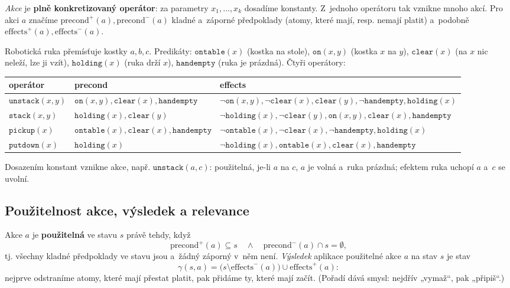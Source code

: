 \begin{definice}[Akce]
\emph{Akce} je \textbf{plně konkretizovaný operátor}: za parametry $x_1,\dots,x_k$ dosadíme konstanty. Z~jednoho operátoru tak vznikne mnoho akcí. Pro akci $a$ značíme $\mathrm{precond}^{+}(a),\mathrm{precond}^{-}(a)$ kladné a~záporné předpoklady (atomy, které mají, resp. nemají platit) a~podobně $\mathrm{effects}^{+}(a),\mathrm{effects}^{-}(a)$.
\end{definice}

\begin{priklad}
Robotická ruka přemísťuje kostky $a,b,c$. Predikáty: $\mathtt{ontable}(x)$ (kostka na stole), $\mathtt{on}(x,y)$ (kostka $x$ na $y$), $\mathtt{clear}(x)$ (na $x$ nic neleží, lze ji vzít), $\mathtt{holding}(x)$ (ruka drží $x$), $\mathtt{handempty}$ (ruka je prázdná). Čtyři operátory:
\begin{center}\footnotesize
\begin{tabular}{@{}lll@{}}
\toprule
operátor & precond & effects \\
\midrule
$\mathtt{unstack}(x,y)$ & $\mathtt{on}(x,y),\mathtt{clear}(x),\mathtt{handempty}$ & $\neg\mathtt{on}(x,y),\neg\mathtt{clear}(x),\mathtt{clear}(y),\neg\mathtt{handempty},\mathtt{holding}(x)$ \\
$\mathtt{stack}(x,y)$ & $\mathtt{holding}(x),\mathtt{clear}(y)$ & $\neg\mathtt{holding}(x),\neg\mathtt{clear}(y),\mathtt{on}(x,y),\mathtt{clear}(x),\mathtt{handempty}$ \\
$\mathtt{pickup}(x)$ & $\mathtt{ontable}(x),\mathtt{clear}(x),\mathtt{handempty}$ & $\neg\mathtt{ontable}(x),\neg\mathtt{clear}(x),\neg\mathtt{handempty},\mathtt{holding}(x)$ \\
$\mathtt{putdown}(x)$ & $\mathtt{holding}(x)$ & $\neg\mathtt{holding}(x),\mathtt{ontable}(x),\mathtt{clear}(x),\mathtt{handempty}$ \\
\bottomrule
\end{tabular}
\end{center}
Dosazením konstant vznikne akce, např. $\mathtt{unstack}(a,c)$: použitelná, je-li $a$ na $c$, $a$ je volná a~ruka prázdná; efektem ruka uchopí $a$ a~$c$ se uvolní.
\end{priklad}

\subsection{Použitelnost akce, výsledek a relevance}

\begin{definice}
Akce $a$ je \textbf{použitelná} ve stavu $s$ právě tehdy, když
\[ \mathrm{precond}^{+}(a)\subseteq s \quad\wedge\quad \mathrm{precond}^{-}(a)\cap s = \emptyset, \]
tj. všechny kladné předpoklady ve stavu jsou a~žádný záporný v~něm není. \emph{Výsledek} aplikace použitelné akce $a$ na stav $s$ je stav
\[ \gamma(s,a) = \bigl(s\setminus \mathrm{effects}^{-}(a)\bigr)\cup \mathrm{effects}^{+}(a): \]
nejprve odstraníme atomy, které mají přestat platit, pak přidáme ty, které mají začít. (Pořadí dává smysl: nejdřív „vymaž``, pak „připiš``.)
\end{definice}

